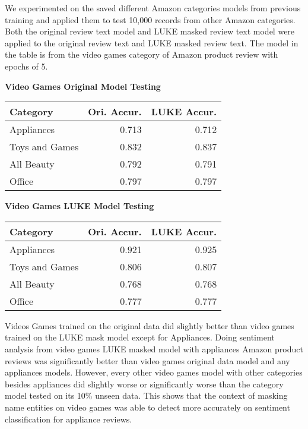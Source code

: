 \documentclass[11pt,a4paper]{article}
\begin{document}
We experimented on the saved different Amazon categories models from previous training and applied them to test 10,000 records from other Amazon categories. Both the original review text model and LUKE masked review text model were applied to the original review text and LUKE masked review text. The model in the table is from the video games category of Amazon product review with epochs of 5. \\

\begin{center}
\textbf{Video Games Original Model Testing}
\begin{tabular}{|l|r|r|}
  \hline
   Category & Ori. Accur. & LUKE Accur. \\
  \hline
  Appliances     & 0.713       & 0.712       \\
  Toys and Games & 0.832       & 0.837       \\
  All Beauty     & 0.792       & 0.791       \\
  Office         & 0.797       & 0.797       \\
  \hline
\end{tabular}
\end{center}

\begin{center}
\textbf{Video Games LUKE Model Testing}
\begin{tabular}{|l|r|r|}
  \hline
    Category & Ori. Accur. & LUKE Accur. \\
  \hline
  Appliances     & 0.921       & 0.925       \\
  Toys and Games & 0.806       & 0.807       \\
  All Beauty     & 0.768       & 0.768       \\
  Office         & 0.777       & 0.777       \\
  \hline
\end{tabular}
\end{center}

Videos Games trained on the original data did slightly better than video games trained on the LUKE mask model except for Appliances. Doing sentiment analysis from video games LUKE masked model with appliances Amazon product reviews was significantly better than video games original data model and any appliances models. However, every other video games model with other categories besides appliances did slightly worse or significantly worse than the category model tested on its 10\% unseen data. This shows that the context of masking name entities on video games was able to detect more accurately on sentiment classification for appliance reviews.
\end{document}
